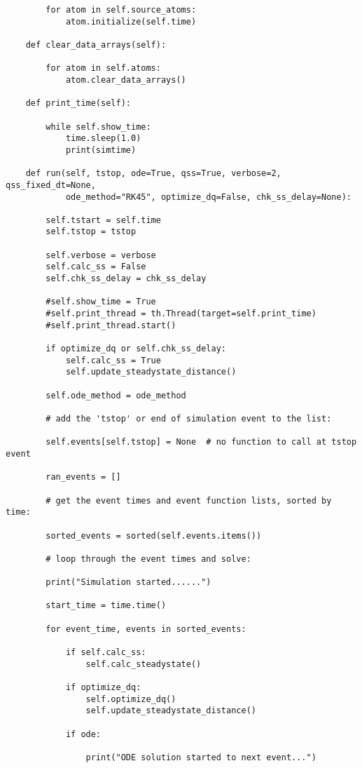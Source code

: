 \begin{lstlisting}
        for atom in self.source_atoms:
            atom.initialize(self.time)

    def clear_data_arrays(self):

        for atom in self.atoms:
            atom.clear_data_arrays()

    def print_time(self):

        while self.show_time:
            time.sleep(1.0)
            print(simtime)
        
    def run(self, tstop, ode=True, qss=True, verbose=2, qss_fixed_dt=None,
            ode_method="RK45", optimize_dq=False, chk_ss_delay=None):

        self.tstart = self.time
        self.tstop = tstop

        self.verbose = verbose
        self.calc_ss = False
        self.chk_ss_delay = chk_ss_delay

        #self.show_time = True
        #self.print_thread = th.Thread(target=self.print_time)
        #self.print_thread.start()

        if optimize_dq or self.chk_ss_delay:
            self.calc_ss = True
            self.update_steadystate_distance()

        self.ode_method = ode_method

        # add the 'tstop' or end of simulation event to the list:

        self.events[self.tstop] = None  # no function to call at tstop event

        ran_events = []

        # get the event times and event function lists, sorted by time:

        sorted_events = sorted(self.events.items())

        # loop through the event times and solve:

        print("Simulation started......")

        start_time = time.time()

        for event_time, events in sorted_events:

            if self.calc_ss:
                self.calc_steadystate()

            if optimize_dq:
                self.optimize_dq()
                self.update_steadystate_distance()

            if ode:

                print("ODE solution started to next event...")


\end{lstlisting}
